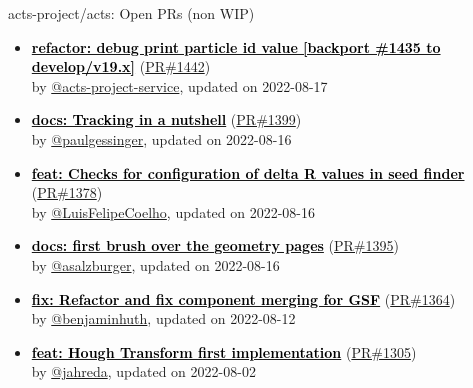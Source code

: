 \documentclass{beamer}
\begin{document}
\begin{frame}[allowframebreaks]{ acts-project/acts: Open PRs (non WIP)}

  \begin{itemize}
    
    \item
    \textbf{\href{https://github.com/acts-project/acts/pull/1442}{\textcolor{black}{refactor: debug print particle id value [backport \#1435 to develop/v19.x]}}}
    (\href{https://github.com/acts-project/acts/pull/1442}{PR\#1442}) \\
    by \href{https://github.com/acts-project-service}{ @acts-project-service}, updated on 2022-08-17

    \item
    \textbf{\href{https://github.com/acts-project/acts/pull/1399}{\textcolor{black}{docs: Tracking in a nutshell}}}
    (\href{https://github.com/acts-project/acts/pull/1399}{PR\#1399}) \\
    by \href{https://github.com/paulgessinger}{ @paulgessinger}, updated on 2022-08-16

    \item
    \textbf{\href{https://github.com/acts-project/acts/pull/1378}{\textcolor{black}{feat: Checks for configuration of delta R values in seed finder}}}
    (\href{https://github.com/acts-project/acts/pull/1378}{PR\#1378}) \\
    by \href{https://github.com/LuisFelipeCoelho}{ @LuisFelipeCoelho}, updated on 2022-08-16

    \item
    \textbf{\href{https://github.com/acts-project/acts/pull/1395}{\textcolor{black}{docs: first brush over the geometry pages}}}
    (\href{https://github.com/acts-project/acts/pull/1395}{PR\#1395}) \\
    by \href{https://github.com/asalzburger}{ @asalzburger}, updated on 2022-08-16

    \item
    \textbf{\href{https://github.com/acts-project/acts/pull/1364}{\textcolor{black}{fix: Refactor and fix component merging for GSF}}}
    (\href{https://github.com/acts-project/acts/pull/1364}{PR\#1364}) \\
    by \href{https://github.com/benjaminhuth}{ @benjaminhuth}, updated on 2022-08-12

    \item
    \textbf{\href{https://github.com/acts-project/acts/pull/1305}{\textcolor{black}{feat: Hough Transform first implementation}}}
    (\href{https://github.com/acts-project/acts/pull/1305}{PR\#1305}) \\
    by \href{https://github.com/jahreda}{ @jahreda}, updated on 2022-08-02

  \end{itemize}

\end{frame}
\end{document}
